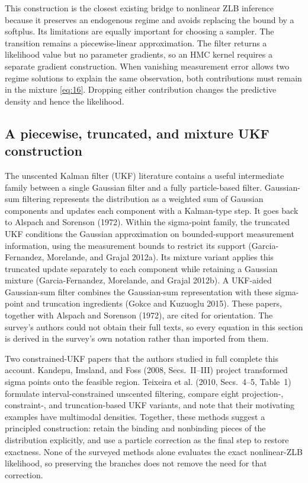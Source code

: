 \documentclass[11pt]{article}
\begin{document}
This construction is the closest existing bridge to nonlinear ZLB inference
because it preserves an endogenous regime and avoids replacing the bound
by a softplus. Its limitations are equally important for choosing a sampler.
The transition remains a piecewise-linear approximation. The filter returns
a likelihood value but no parameter gradients, so an HMC kernel requires a
separate gradient construction. When vanishing measurement error allows two
regime solutions to explain the same observation, both contributions must
remain in the mixture \eqref{eq:16}. Dropping either
contribution changes the predictive density and hence the likelihood.

\subsection{A piecewise, truncated, and mixture UKF construction}
\label{sec:ukf}

The unscented Kalman filter (UKF) literature contains a useful intermediate family between a single Gaussian filter and a fully particle-based filter. Gaussian-sum filtering represents the distribution as a weighted sum of Gaussian components and updates each component with a Kalman-type step. It goes back to Alspach and Sorenson (1972). Within the sigma-point family, the truncated UKF conditions the Gaussian approximation on bounded-support measurement information, using the measurement bounds to restrict its support (Garcia-Fernandez, Morelande, and Grajal 2012a). Its mixture variant applies this truncated update separately to each component while retaining a Gaussian mixture (Garcia-Fernandez, Morelande, and Grajal 2012b). A UKF-aided Gaussian-sum filter combines the Gaussian-sum representation with these sigma-point and truncation ingredients (Gokce and Kuzuoglu 2015). These papers, together with Alspach and Sorenson (1972), are cited for orientation. The survey's authors could not obtain their full texts, so every equation in this section is derived in the survey's own notation rather than imported from them.

Two constrained-UKF papers that the authors studied in full complete this account. Kandepu, Imsland, and Foss (2008, Secs.~II--III) project transformed sigma points onto the feasible region. Teixeira et al. (2010, Secs.~4--5, Table~1) formulate interval-constrained unscented filtering, compare eight projection-, constraint-, and truncation-based UKF variants, and note that their motivating examples have multimodal densities. Together, these methods suggest a principled construction: retain the binding and nonbinding pieces of the distribution explicitly, and use a particle correction as the final step to restore exactness. None of the surveyed methods alone evaluates the exact nonlinear-ZLB likelihood, so preserving the branches does not remove the need for that correction.
\end{document}
